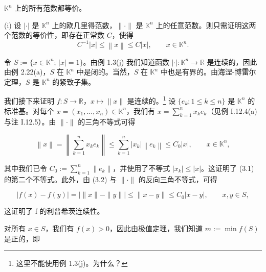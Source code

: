 \begin{example}

\begin{items}
\item

$ \mathbb{K}^{n} $ 上的所有范数都等价。

\begin{subitems}
\item

\proofhead
(i) 设 $ |\cdot| $ 是 $ \mathbb{K}^n $ 上的欧几里得范数，$ \|\cdot\| $ 是 $ \mathbb{K}^n $ 上的任意范数。则只需证明这两个范数的等价性，即存在正常数 $ C $，使得
\begin{equation}
C^{-1}\left|x\right|\leq\left\|x\right\|\leq C\left|x\right|,\qquad x\in\mathbb{K}^{n}.
\end{equation}
\item

令 $ S := \{ x \in \mathbb{K}^n ; \, |x| = 1 \} $。由例 1.3(j) 我们知道函数 $ |\cdot| : \mathbb{K}^n \to \mathbb{R} $ 是连续的，因此由例 2.22(a)，$ S $ 在 $ \mathbb{K}^n $ 中是闭的。当然，$ S $ 在 $ \mathbb{K}^n $ 中也是有界的。由海涅-博雷尔定理，$ S $ 是 $ \mathbb{K}^n $ 的紧致子集。

\item

我们接下来证明 $f: S \to \mathbb{R}$，$x \mapsto \|x\|$ 是连续的。\footnote{这里不能使用例 1.3(j)。为什么？} 设 $\{e_k; 1 \leq k \leq n\}$ 是 $\mathbb{K}^n$ 的标准基。对每个 $x = (x_1, \ldots, x_n) \in \mathbb{K}^n$，我们有 $x = \sum_{k=1}^n x_k e_k$（见例 I.12.4(a) 与注 I.12.5）。由 $\|\cdot\|$ 的三角不等式可得

\begin{equation}
\left\|x\right\|=\left\|\sum_{k=1}^{n}x_{k}e_{k}\right\|\leq\sum_{k=1}^{n}\left|x_{k}\right|\left\|e_{k}\right\|\leq C_{0}\left|x\right|\mathrm{,}\qquad x\in\mathbb{K}^{n},
\end{equation}

其中我们已令 $C_0 := \sum_{k=1}^n \|e_k\|$，并使用了不等式 $|x_k| \leq |x|$。这证明了 (3.1) 的第二个不等式。此外，由 (3.2) 与 $\|\cdot\|$ 的反向三角不等式，可得

\[
|f(x)-f(y)|=\left|\|x\|-\|y\|\right|\leq\|x-y\|\leq C_{0}\left|x-y\right|,\qquad x,y\in S,
\]

这证明了 f 的利普希茨连续性。

\item

对所有 $ x \in S $，我们有 $ f(x) > 0 $，因此由极值定理，我们知道 $ m := \min f(S) $ 是正的，即


\end{subitems}
\end{items}
\end{example}
